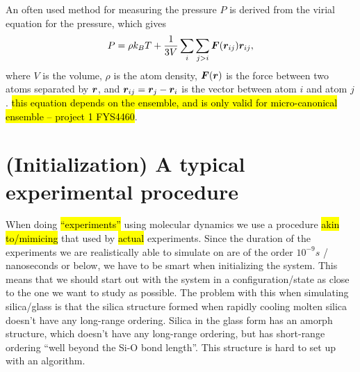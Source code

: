 An often used method for measuring the pressure $P$ is derived from the virial equation for the pressure, which gives
\begin{align*}
    P = \rho k_B T + \frac{1}{3V}\sum_i \sum_{j>i} \boldsymbol{F}(\boldsymbol{r}_{ij}) \boldsymbol{r}_{ij},
\end{align*}
where $V$ is the volume, $\rho$ is the atom density, $\boldsymbol{F}(\boldsymbol{r})$ is the force between two atoms separated by $\boldsymbol{r}$, and $\boldsymbol{r}_{ij} = \boldsymbol{r}_j - \boldsymbol{r}_i$ is the vector between atom $i$ and atom $j$. \hl{this equation depends on the ensemble, and is only valid for micro-canonical ensemble -- project 1 FYS4460}.



\section{(Initialization) A typical experimental procedure}
When doing \hl{``experiments''} using molecular dynamics we use a procedure \hl{akin to/mimicing} that used by \hl{actual} experiments. Since the duration of the experiments we are realistically able to simulate on are of the order $10^{-9} s$ / nanoseconds or below, we have to be smart when initializing the system. This means that we should start out with the system in a configuration/state as close to the one we want to study as possible. The problem with this when simulating silica/glass is that the silica structure formed when rapidly cooling molten silica doesn't have any long-range ordering. Silica in the glass form has an amorph structure, which doesn't have any long-range ordering, but has short-range ordering ``well beyond the Si-O bond length''. This structure is hard to set up with an algorithm.

